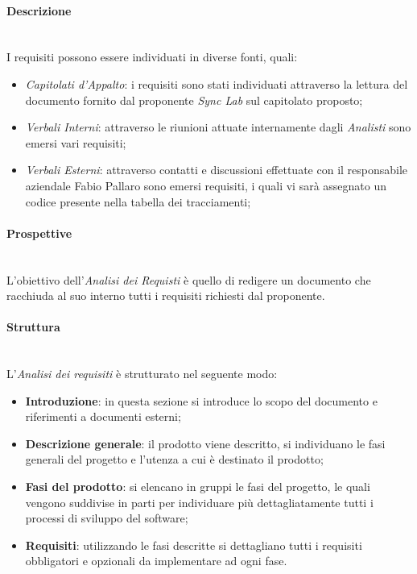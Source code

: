 \paragraph{Descrizione}\label{2.2.3.1.2}\mbox{}\\
I requisiti possono essere individuati in diverse fonti, quali:
\begin{itemize}
	\item \textit{Capitolati d'Appalto}: i requisiti sono stati individuati attraverso la lettura del documento fornito dal proponente \textit{Sync Lab} sul capitolato proposto;
	\item \textit{Verbali Interni}: attraverso le riunioni attuate internamente dagli \textit{Analisti} sono emersi vari requisiti;
	\item \textit{Verbali Esterni}: attraverso contatti e discussioni effettuate con il responsabile aziendale Fabio Pallaro sono emersi requisiti, i quali vi sarà assegnato un codice presente nella tabella dei tracciamenti;
\end{itemize}
\paragraph{Prospettive}\label{2.2.3.1.3}\mbox{}\\
L'obiettivo dell'\textit{Analisi dei Requisti} è quello di redigere un documento che racchiuda al suo interno tutti i requisiti richiesti dal proponente.
\paragraph{Struttura}\label{2.2.3.1.4}\mbox{}\\ %
L'\textit{Analisi dei requisiti} è strutturato nel seguente modo:
\begin{itemize}
	\item \textbf{Introduzione}: in questa sezione si introduce lo scopo del documento e riferimenti a documenti esterni;
	\item \textbf{Descrizione generale}: il prodotto viene descritto, si individuano le fasi generali del progetto e l'utenza a cui è destinato il prodotto;
	\item \textbf{Fasi del prodotto}: si elencano in gruppi le fasi del progetto, le quali vengono suddivise in parti per individuare più dettagliatamente tutti i processi di sviluppo del software;
	\item \textbf{Requisiti}: utilizzando le fasi descritte si dettagliano tutti i requisiti obbligatori e opzionali da implementare ad ogni fase.
\end{itemize}
